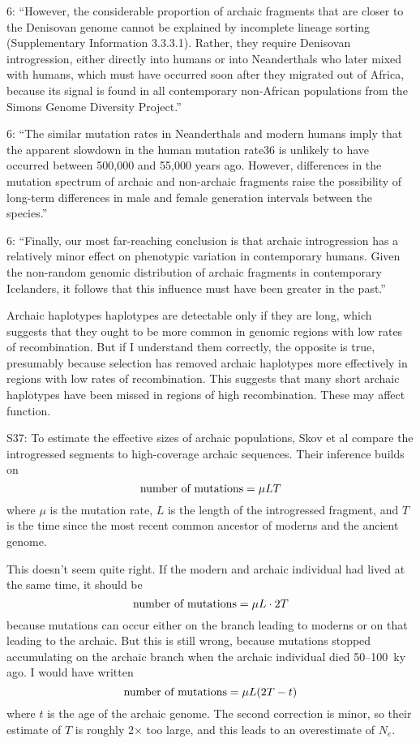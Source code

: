 \documentclass{article}
\begin{document}
6: ``However, the considerable proportion of archaic fragments that
are closer to the Denisovan genome cannot be explained by incomplete
lineage sorting (Supplementary Information 3.3.3.1). Rather, they
require Denisovan introgression, either directly into humans or into
Neanderthals who later mixed with humans, which must have occurred
soon after they migrated out of Africa, because its signal is found in
all contemporary non-African populations from the Simons Genome
Diversity Project.''

6: ``The similar mutation rates in Neanderthals and modern humans
imply that the apparent slowdown in the human mutation rate36 is
unlikely to have occurred between 500,000 and 55,000 years
ago. However, differences in the mutation spectrum of archaic and
non-archaic fragments raise the possibility of long-term differences
in male and female generation intervals between the species.''

6: ``Finally, our most far-reaching conclusion is that archaic
introgression has a relatively minor effect on phenotypic variation in
contemporary humans. Given the non-random genomic distribution of
archaic fragments in contemporary Icelanders, it follows that this
influence must have been greater in the past.''

Archaic haplotypes haplotypes are detectable only if they are long,
which suggests that they ought to be more common in genomic regions
with low rates of recombination. But if I understand them correctly,
the opposite is true, presumably because selection has removed archaic
haplotypes more effectively in regions with low rates of
recombination. This suggests that many short archaic haplotypes have
been missed in regions of high recombination. These may affect
function.

S37: To estimate the effective sizes of archaic populations, Skov et
al compare the introgressed segments to high-coverage archaic
sequences. Their inference builds on
\[
\hbox{number of mutations} = \mu L T
\]
where $\mu$ is the
mutation rate, $L$ is the length of the introgressed fragment, and $T$
is the time since the most recent common ancestor of moderns and the
ancient genome. 

This doesn't seem quite right. If the modern and archaic individual
had lived at the same time, it should be
\[
\hbox{number of mutations} = \mu L \cdot 2T
\]
because mutations can occur either on the branch leading to moderns or
on that leading to the archaic.  But this is still wrong, because
mutations stopped accumulating on the archaic branch when the archaic
individual died 50--100~ky ago. I would have written
\[
\hbox{number of mutations} = \mu L (2T - t)
\]
where $t$ is the age of the archaic genome. The second correction is
minor, so their estimate of $T$ is roughly 2$\times$ too large, and
this leads to an overestimate of $N_e$.
\end{document}
